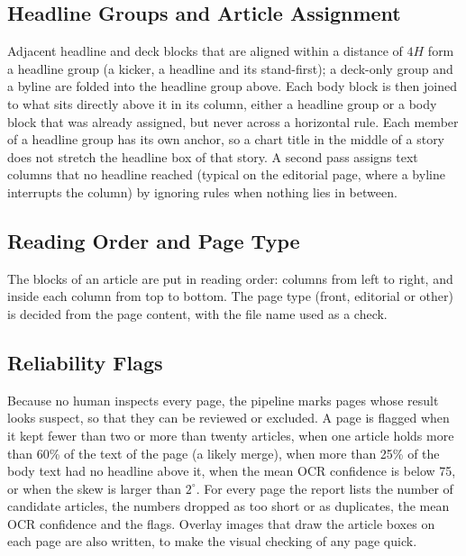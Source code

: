 \subsection{Headline Groups and Article Assignment}
Adjacent headline and deck blocks that are aligned within a distance of $4H$ form a headline group (a kicker, a headline and its stand-first); a deck-only group and a byline are folded into the headline group above. Each body block is then joined to what sits directly above it in its column, either a headline group or a body block that was already assigned, but never across a horizontal rule. Each member of a headline group has its own anchor, so a chart title in the middle of a story does not stretch the headline box of that story. A second pass assigns text columns that no headline reached (typical on the editorial page, where a byline interrupts the column) by ignoring rules when nothing lies in between.

\subsection{Reading Order and Page Type}
The blocks of an article are put in reading order: columns from left to right, and inside each column from top to bottom. The page type (front, editorial or other) is decided from the page content, with the file name used as a check.

\subsection{Reliability Flags}
Because no human inspects every page, the pipeline marks pages whose result looks suspect, so that they can be reviewed or excluded. A page is flagged when it kept fewer than two or more than twenty articles, when one article holds more than 60\% of the text of the page (a likely merge), when more than 25\% of the body text had no headline above it, when the mean OCR confidence is below 75, or when the skew is larger than $2^{\circ}$. For every page the report lists the number of candidate articles, the numbers dropped as too short or as duplicates, the mean OCR confidence and the flags. Overlay images that draw the article boxes on each page are also written, to make the visual checking of any page quick.

